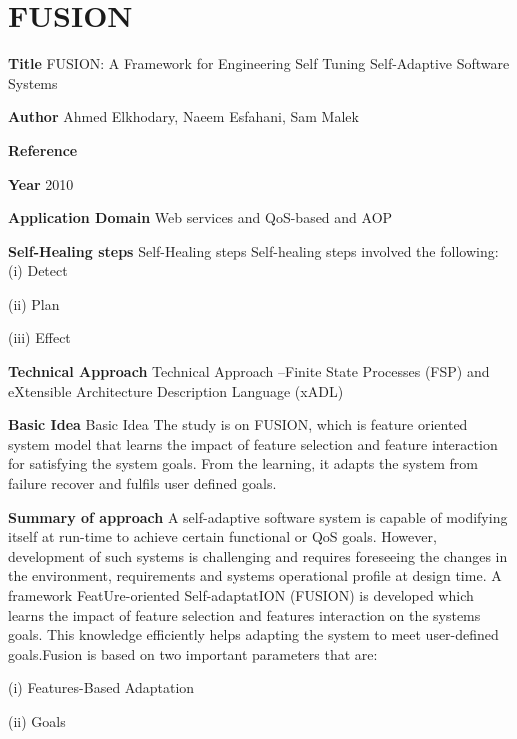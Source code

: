 \section{FUSION}\label{FUSION}
\begin{compactitem}
\item[\textbf{Title}]FUSION: A Framework for Engineering Self Tuning Self-Adaptive Software Systems
\item[\textbf{Author}]Ahmed Elkhodary,  Naeem  Esfahani, Sam Malek\item[\textbf{Reference}] 
\cite{elkhodary_fusion:_2012}

\item[\textbf{Year}] 2010

\item[\textbf{Application Domain}]Web services and QoS-based and AOP

\item[\textbf{Self-Healing steps}] Self-Healing steps   Self-healing steps involved the following:
(i) Detect 

(ii) Plan

(iii) Effect

\item[\textbf{Technical Approach}]
Technical Approach –Finite State Processes (FSP) and eXtensible Architecture Description Language (xADL)

\item[\textbf{Basic Idea}]  Basic Idea The study is on FUSION, which is feature oriented system model that learns the impact of feature selection and feature interaction for satisfying the system goals. From the learning, it adapts the system from failure recover and fulfils user defined goals. 

\item[\textbf{Summary of approach}] 
A self-adaptive software system is capable of modifying itself at run-time to achieve certain 
functional or QoS goals. However, development of such systems is challenging and requires foreseeing the changes in the environment, requirements and systems operational profile at design time. A framework FeatUre-oriented Self-adaptatION (FUSION) is developed which learns the 
impact of feature selection and features interaction on the systems goals. This knowledge efficiently helps adapting the system to meet user-defined goals.Fusion is based on two important parameters that are:

(i) Features-Based Adaptation

(ii) Goals


\end{compactitem}

